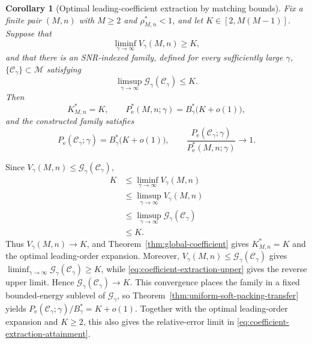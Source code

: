 \documentclass[12pt,draftclsnofoot,onecolumn]{IEEEtran}
\newcommand{\cC}{\mathcal{C}}
\newcommand{\cG}{\mathcal{G}}
\newcommand{\cM}{\mathcal{M}}
\newcommand{\Pe}{P_{\mathrm e}}
\newtheorem{corollary}{Corollary}
\theoremstyle{definition}
\begin{document}
\begin{corollary}[Optimal leading-coefficient extraction by matching bounds]
\label{cor:coefficient-extraction}
Fix a finite pair \((M,n)\) with \(M\ge2\) and
\(\rho^{\ast}_{M,n}<1\), and let \(K\in[2,M(M-1)]\).  Suppose that
\begin{equation}
  \liminf_{\gamma\to\infty}V_\gamma(M,n)\ge K,
  \label{eq:coefficient-extraction-lower}
\end{equation}
and that there is an SNR-indexed family, defined for every sufficiently
large \(\gamma\),
\(\{\cC_\gamma\}\subset\cM\) satisfying
\begin{equation}
  \limsup_{\gamma\to\infty}
  \cG_\gamma(\cC_\gamma)\le K.
  \label{eq:coefficient-extraction-upper}
\end{equation}
Then
\begin{equation}
  K^{\ast}_{M,n}=K,
  \qquad
  \Pe^{\ast}(M,n;\gamma)
  =B_\gamma^{\ast}\bigl(K+o(1)\bigr),
  \label{eq:coefficient-extraction-conclusion}
\end{equation}
and the constructed family satisfies
\begin{equation}
  \Pe(\cC_\gamma;\gamma)
  =B_\gamma^{\ast}\bigl(K+o(1)\bigr),
  \qquad
  \frac{\Pe(\cC_\gamma;\gamma)}
  {\Pe^{\ast}(M,n;\gamma)}\to1.
  \label{eq:coefficient-extraction-attainment}
\end{equation}
\end{corollary}

\begin{IEEEproof}
Since \(V_\gamma(M,n)\le\cG_\gamma(\cC_\gamma)\),
\begin{align*}
  K
  &\le\liminf_{\gamma\to\infty}V_\gamma(M,n)\\
  &\le\limsup_{\gamma\to\infty}V_\gamma(M,n)\\
  &\le\limsup_{\gamma\to\infty}\cG_\gamma(\cC_\gamma)\\
  &\le K.
\end{align*}
Thus \(V_\gamma(M,n)\to K\), and
Theorem~\ref{thm:global-coefficient} gives
\(K^{\ast}_{M,n}=K\) and the optimal leading-order expansion.  Moreover,
\(V_\gamma(M,n)\le\cG_\gamma(\cC_\gamma)\) gives
\(\liminf_{\gamma\to\infty}\cG_\gamma(\cC_\gamma)\ge K\), while
\eqref{eq:coefficient-extraction-upper} gives the reverse upper limit.
Hence \(\cG_\gamma(\cC_\gamma)\to K\).  This convergence places the
family in a fixed bounded-energy sublevel of \(\cG_\gamma\), so
Theorem~\ref{thm:uniform-soft-packing-transfer} yields
\(\Pe(\cC_\gamma;\gamma)/B_\gamma^{\ast}=K+o(1)\).  Together with the
optimal leading-order expansion and \(K\ge2\), this also gives the relative-error
limit in \eqref{eq:coefficient-extraction-attainment}.
\end{IEEEproof}
\end{document}
